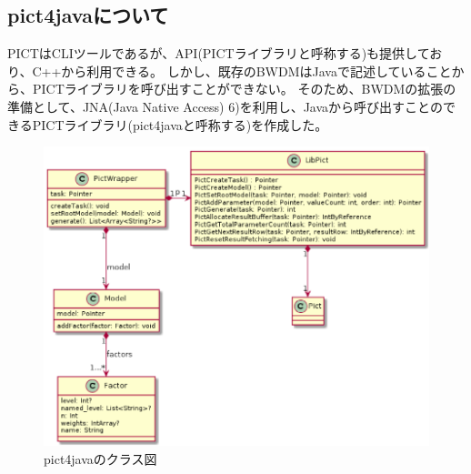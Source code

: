 \documentclass[uplatex, report, a4j, 10pt]{jsbook}
\begin{document}
\subsection{pict4javaについて}
PICTはCLIツールであるが、API(PICTライブラリと呼称する)も提供しており、C++から利用できる。
しかし、既存のBWDMはJavaで記述していることから、PICTライブラリを呼び出すことができない。
そのため、BWDMの拡張の準備として、JNA(Java Native Access) 6)を利用し、Javaから呼び出すことのできるPICTライブラリ(pict4javaと呼称する)を作成した。

\begin{figure}[tp]
  \centering
  \includegraphics[keepaspectratio, width=160mm]{figs/pict4java_class}
  \caption{pict4javaのクラス図}
  \label{fig:pict4javaClass}
\end{figure}
\end{document}
